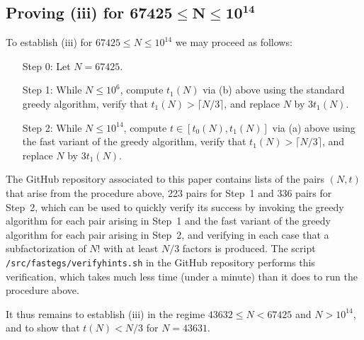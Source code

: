 \documentclass[12pt,a4paper,reqno]{amsart}
\numberwithin{equation}{section}
\theoremstyle{plain}
\theoremstyle{definition}
\begin{document}
\subsection{Proving \texorpdfstring{}{Theorem 1.3}(iii) for \texorpdfstring{$\boldsymbol{67425 \le N \le 10^{14}}$}{67245 <= N <= 1e14}}
To establish (iii) for $67425 \leq N \leq 10^{14}$ we may proceed as follows:
\begin{enumerate}
\item[Step 0:] Let $N=67425$.
\item[Step 1:] While $N\le 10^6$, compute $t_1(N)$ via (b) above using the standard greedy algorithm, verify that $t_1(N) > \lceil N/3\rceil$, and replace $N$ by $3t_1(N)$.
\item[Step 2:] While $N\le 10^{14}$, compute $t\in [t_0(N),t_1(N)]$ via (a) above using the fast variant of the greedy algorithm, verify that $t_1(N) > \lceil N/3\rceil$, and replace $N$ by $3t_1(N)$.
\end{enumerate}
The GitHub repository \cite{github} associated to this paper contains lists of the pairs $(N,t)$ that arise from the procedure above, 223 pairs for Step~1 and 336 pairs for Step~2, which can be used to quickly verify its success by invoking the greedy algorithm for each pair arising in Step~1 and the fast variant of the greedy algorithm for each pair arising in Step~2, and verifying in each case that a subfactorization of $N!$ with at least $N/3$ factors is produced.  The script \texttt{/src/fastegs/verifyhints.sh} in the GitHub repository \cite{github} performs this verification, which takes much less time (under a minute) than it does to run the procedure above.

It thus remains to establish (iii) in the regime $43632 \leq N < 67425$ and $N > 10^{14}$, and to show that $t(N)<N/3$ for $N=43631$.
\end{document}
